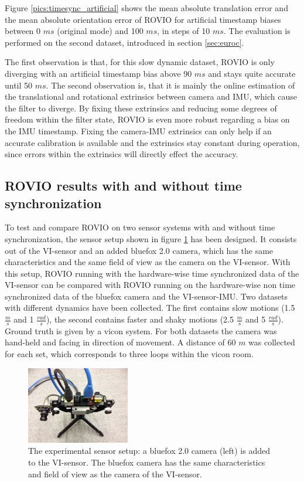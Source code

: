 Figure \ref{pics:timesync_artificial} shows the mean absolute translation error and the mean absolute orientation error of ROVIO for artificial timestamp biases between 0 $ms$ (original mode) and 100 $ms$, in steps of 10 $ms$. The evaluation is performed on the second dataset, introduced in section \ref{sec:euroc}. 

The first observation is that, for this slow dynamic dataset, ROVIO is only diverging with an artificial timestamp bias above 90 $ms$ and stays quite accurate until 50 $ms$. The second observation is, that it is mainly the online estimation of the translational and rotational extrinsics between camera and IMU, which cause the filter to diverge. By fixing these extrinsics and reducing some degrees of freedom within the filter state, ROVIO is even more robust regarding a bias on the IMU timestamp. Fixing the camera-IMU extrinsics can only help if an accurate calibration is available and the extrinsics stay constant during operation, since errors within the extrinsics will directly effect the accuracy.



\subsection{ROVIO results with and without time synchronization}
\label{sec:timesync_real}

To test and compare ROVIO on two sensor systems with and without time synchronization, the sensor setup shown in figure \ref{pics:vi_bluefox} has been designed. It consists out of the VI-sensor and an added bluefox 2.0 camera, which has the same characteristics and the same field of view as the camera on the VI-sensor. With this setup, ROVIO running with the hardware-wise time synchronized data of the VI-sensor can be compared with ROVIO running on the hardware-wise non time synchronized data of the bluefox camera and the VI-sensor-IMU. Two datasets with different dynamics have been collected. The first contains slow motions (1.5 $\frac{m}{s}$ and 1 $\frac{rad}{s}$), the second contains faster and shaky motions (2.5 $\frac{m}{s}$ and 5 $\frac{rad}{s}$). Ground truth is given by a vicon system. For both datasets the camera was hand-held and facing in direction of movement. A distance of 60 $m$ was collected for each set, which corresponds to three loops within the vicon room. \\

\begin{figure}[h]
   \centering
   \includegraphics[width=0.4\textwidth]{images/vi_bluefox.JPG}
   \caption{The experimental sensor setup: a bluefox 2.0 camera (left) is added to the VI-sensor. The bluefox camera has the same characteristics and field of view as the camera of the VI-sensor.}
   \label{pics:vi_bluefox}
\end{figure}

